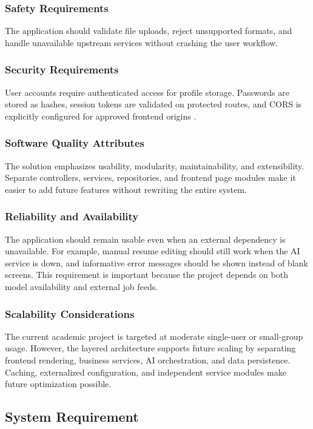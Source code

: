 \subsubsection{Safety Requirements}
\noindent The application should validate file uploads, reject unsupported formats, and handle unavailable upstream services without crashing the user workflow.

\subsubsection{Security Requirements}
\noindent User accounts require authenticated access for profile storage. Passwords are stored as hashes, session tokens are validated on protected routes, and CORS is explicitly configured for approved frontend origins \cite{spring_security_docs}.

\subsubsection{Software Quality Attributes}
\noindent The solution emphasizes usability, modularity, maintainability, and extensibility. Separate controllers, services, repositories, and frontend page modules make it easier to add future features without rewriting the entire system.

\subsubsection{Reliability and Availability}
\noindent The application should remain usable even when an external dependency is unavailable. For example, manual resume editing should still work when the AI service is down, and informative error messages should be shown instead of blank screens. This requirement is important because the project depends on both model availability and external job feeds.

\subsubsection{Scalability Considerations}
\noindent The current academic project is targeted at moderate single-user or small-group usage. However, the layered architecture supports future scaling by separating frontend rendering, business services, AI orchestration, and data persistence. Caching, externalized configuration, and independent service modules make future optimization possible.

\subsection{System Requirement}
